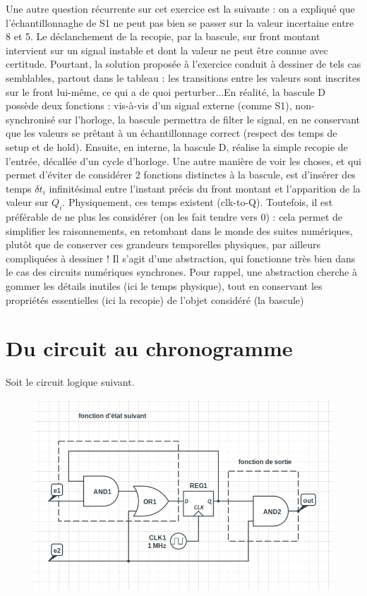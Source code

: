 \documentclass[a4paper,11pt]{article}
\begin{document}
Une autre question récurrente sur cet exercice est la suivante : on a expliqué que l'échantillonnaghe de S1 ne peut pas bien se passer sur la valeur incertaine entre 8 et 5.
Le déclanchement de la recopie, par la bascule, sur front montant intervient sur un signal instable et dont la valeur ne peut être connue avec certitude.
Pourtant, la solution proposée à l'exercice conduit à dessiner de tels cas semblables, partout dans le tableau : les transitions entre les valeurs sont inscrites sur le front lui-même, ce qui
a de quoi perturber...En réalité, la bascule D possède deux fonctions : vis-à-vis d'un signal externe (comme S1), non-synchronisé sur l'horloge, la bascule permettra de filter le signal, en ne conservant que
les valeurs se prêtant à un échantillonnage correct (respect des temps de setup et de hold). Ensuite, en interne, la bascule D, réalise la simple recopie de l'entrée, décallée d'un cycle
d'horloge. Une autre manière de voir les choses, et qui permet d'éviter de considérer 2 fonctions distinctes à la bascule, est d'insérer des temps $\delta t_i$ infinitésimal entre l'instant précis
du front montant et l'apparition de la valeur sur $Q_i$. Physiquement, ces temps existent (clk-to-Q). Toutefois, il est préférable de ne plus les considérer (on les fait tendre vers 0) : cela
 permet de simplifier les raisonnements, en retombant dans le monde des suites numériques, plutôt que de conserver ces grandeurs temporelles physiques, par ailleurs compliquées à dessiner !
 Il s'agit d'une abstraction, qui fonctionne très bien dans le cas des circuits numériques synchrones. Pour rappel, une abstraction cherche à gommer les détails inutiles (ici le temps physique), tout en conservant les propriétés essentielles (ici la recopie) de l'objet considéré (la bascule)


\newpage
\section{Du circuit au chronogramme}

Soit le circuit logique suivant.

\begin{figure}[!h]
\begin{center}
\includegraphics[scale=0.3]{./figures/fsm-ex1.png}
\end{center}
\end{figure}
\end{document}
